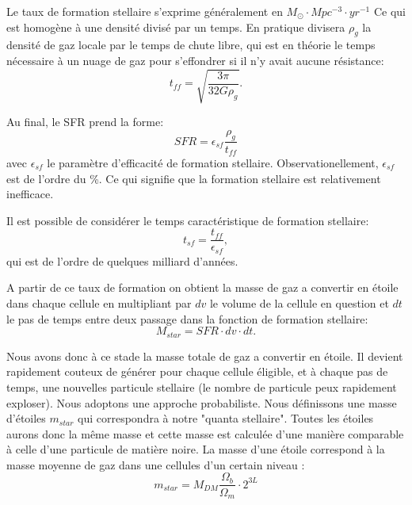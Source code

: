 Le taux de formation stellaire s'exprime généralement en $M_\odot \cdot Mpc^{-3}  \cdot yr^{-1}$  
Ce qui est homogène à une densité divisé par un temps.
En pratique divisera $\rho_g$ la densité de gaz locale par le temps de chute libre, qui est en théorie le temps nécessaire à un nuage de gaz pour s'effondrer si il n'y avait aucune résistance:
\begin{equation}
t_{ff} = \sqrt{\frac{3\pi}{32G\rho_g}}.
\end{equation}

Au final, le \ac{SFR} prend la forme:
\begin{equation}
	SFR = \epsilon_{sf} \frac{\rho_g}{t_{ff}}
    \label{eq_sfr}
\end{equation}
avec  $\epsilon_{sf}$ le paramètre d'efficacité de formation stellaire.
Observationellement, $\epsilon_{sf}$  est de l'ordre du \%. %
Ce qui signifie que la formation stellaire est relativement inefficace.

Il est possible de considérer le temps caractéristique de formation stellaire:
\begin{equation}
t_{sf} =  \frac{t_{ff}}{ \epsilon_{sf} },
\end{equation}
qui est de l'ordre de quelques milliard d'années.

A partir de ce taux de formation on obtient la masse de gaz a convertir en étoile dans chaque cellule en multipliant par $dv$ le volume de la cellule en question et $dt$ le pas de temps entre deux passage dans la fonction de formation stellaire:
\begin{equation}
	M_{star} = SFR \cdot dv \cdot dt .
\end{equation}

Nous avons donc à ce stade la masse totale de gaz a convertir en étoile.
Il devient rapidement couteux de générer pour chaque cellule éligible, et à chaque pas de temps, une nouvelles particule stellaire (le nombre de particule peux rapidement exploser).
Nous adoptons une approche probabiliste.
Nous définissons une masse d'étoiles $m_{star}$ qui correspondra à notre "quanta stellaire".
Toutes les étoiles aurons donc la même masse et cette masse est calculée d'une manière comparable à celle d'une particule de matière noire.
La masse d'une étoile correspond à la masse moyenne de gaz dans une cellules d'un certain niveau :
\begin{equation}
 m_{star} = M_{DM} \frac{\Omega_b}{\Omega_m}\cdot 2^{3L}
\end{equation}

